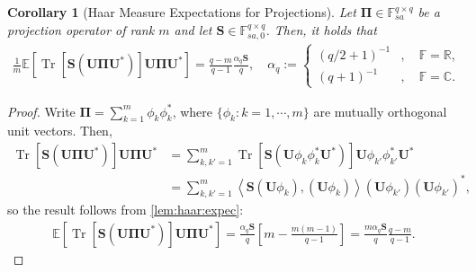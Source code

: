 \documentclass[noinfoline]{imsart}\setcounter{tocdepth}{2}
\renewcommand{\b}[1]{\mathbb{#1}} %
\newcommand{\m}[1]{\mathbf{#1}} %
\newcommand{\tr}[1]{\operatorname{Tr}\left[#1\right]}
\newcommand{\innpr}[2]{{\left\langle {#1},{#2}\right\rangle}} %
\theoremstyle{plain}
\newtheorem{corollary}[theorem]{Corollary}
\begin{document}
\begin{appendix}
\begin{corollary}[Haar Measure Expectations for Projections]\label{lem:haar:expec:v2}
Let $\m{\Pi} \in \b{F}_{sa}^{q \times q}$ be a projection operator of rank $m$ and let $\m{S} \in \b{F}_{sa, 0}^{q \times q}$. Then, it holds that
\begin{align*}
    \frac{1}{m} \b{E}\left[\tr{\m{S}(\m{U} \m{\Pi} \m{U}^{*})} \m{U} \m{\Pi} \m{U}^{*} \right] =  \frac{q - m}{q-1} \frac{\alpha_{q} \m{S}}{q}, \quad \alpha_{q} := \begin{cases}
        (q/2+1)^{-1} &, \quad \b{F} = \b{R}, \\
        (q+1)^{-1} &, \quad \b{F} = \b{C}.
    \end{cases} 
\end{align*}
\end{corollary}
\begin{proof}
Write $\m{\Pi} = \sum_{k=1}^{m} \phi_{k} \phi_{k}^{*}$,
where $\{\phi_{k}: k = 1, \cdots, m \}$ are mutually orthogonal unit vectors. Then,
\begin{align*}
    \tr{\m{S}(\m{U} \m{\Pi} \m{U}^{*})} \m{U} \m{\Pi} \m{U}^{*} &= \sum_{k, k'=1}^{m} \tr{\m{S}(\m{U} \phi_{k} \phi_{k}^{*} \m{U}^{*})} \m{U} \phi_{k'} \phi_{k'}^{*} \m{U}^{*} \\
    &= \sum_{k, k'=1}^{m} \innpr{\m{S} (\m{U} \phi_{k})}{(\m{U} \phi_{k})} (\m{U} \phi_{k'}) (\m{U} \phi_{k'})^{*},
\end{align*}
so the result follows from \cref{lem:haar:expec}:
\begin{align*}
    \b{E}\left[\tr{\m{S}(\m{U} \m{\Pi} \m{U}^{*})} \m{U} \m{\Pi} \m{U}^{*} \right] =   \frac{\alpha_{q} \m{S}}{q} \left[ m -  \frac{m(m-1)}{q-1} \right] = \frac{m \alpha_{q} \m{S}}{q} \frac{q - m}{q-1}.
\end{align*}
\end{proof}


\end{appendix}
\end{document}

